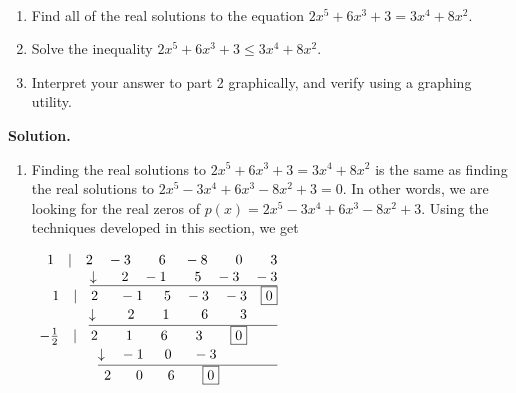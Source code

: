 \documentclass{ximera}
\begin{document}
\begin{example}  \label{polyeqineqexample} $~$

\begin{enumerate}

\item  Find all of the real solutions to the equation $2x^5+6x^3+3 = 3x^4+8x^2$. 

\item  Solve the inequality $2x^5+6x^3+3 \leq 3x^4+8x^2$.

\item  Interpret your answer to part 2 graphically, and verify using a graphing utility.


\end{enumerate}

{\bf Solution.} 

\begin{enumerate}

\item  Finding the real solutions to $2x^5+6x^3+3 = 3x^4+8x^2$ is the same as finding the real solutions to $2x^5-3x^4+6x^3-8x^2+3=0$.  In other words, we are looking for the real zeros of $p(x)=  2x^5-3x^4+6x^3-8x^2+3$.  Using the techniques developed in this section, we get

\begin{center}
$
\begin{array}{r}
 1 \quad |\quad 2 \phantom{11} -3 \quad\quad 6 \phantom{.}\quad -8 \quad\quad 0 \quad\quad 3\\
 \underline{\downarrow \phantom{1}\quad  2 \quad -1\quad\quad 5 \quad -3 \quad -3}\\
 1 \quad |\quad 2 \quad\phantom{1} -1 \quad\phantom{1} 5 \quad -3 \quad -3 \quad \fbox{0}\\
 \underline{\downarrow \phantom{11}\quad  2 \quad\quad 1\quad\quad\phantom{.} 6 \quad\quad\phantom{.} 3 \phantom{\quad \fbox{0}}}\\
 -\frac{1}{2} \quad |\quad 2 \quad\quad 1 \quad\phantom{11} 6 \quad\quad 3 \quad\quad \fbox{0} \phantom{\quad \fbox{0}}\\
 \underline{\downarrow \phantom{1.} -1 \quad\phantom{1} 0 \quad\phantom{1} -3 \phantom{\quad \fbox{0} \quad \fbox{0}}}\\
2 \phantom{1.}\quad 0 \phantom{1.}\quad 6 \phantom{11}\quad \fbox{0} \phantom{\quad\quad \fbox{000}}
\end{array}
$   
\end{center}
 



\end{enumerate}
\end{example}
\end{document}
